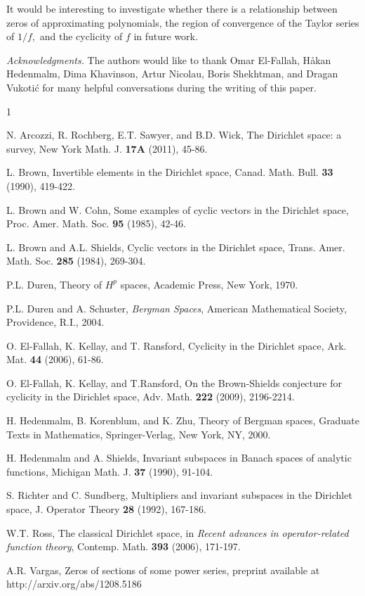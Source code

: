 \documentclass[11 pt,reqno]{amsart}
\theoremstyle{definition}
\theoremstyle{remark}
\numberwithin{equation}{section} \numberwithin{figure}{section}
\begin{document}
It would be interesting to investigate whether there is a relationship between zeros of approximating polynomials, the region of convergence of the Taylor series of $1/f,$
and the cyclicity of $f$ in future work.


\textit{Acknowledgments.} The authors would like to thank Omar El-Fallah, H{\aa}kan Hedenmalm, Dima Khavinson, Artur Nicolau, Boris Shekhtman, and Dragan Vukoti\'{c} for many helpful conversations during the writing of this paper.

\begin{thebibliography}{1}

N. Arcozzi, R. Rochberg, E.T. Sawyer, and B.D. Wick, The
Dirichlet space: a survey, New York Math. J. {\bf 17A} (2011), 45-86.

L. Brown, Invertible elements in the Dirichlet space, Canad.
Math. Bull. {\bf 33} (1990), 419-422.

L. Brown and W. Cohn, Some examples of cyclic vectors in
the Dirichlet space, Proc. Amer. Math. Soc. {\bf 95} (1985), 42-46.

L. Brown and A.L. Shields, Cyclic vectors in the Dirichlet space,
Trans. Amer. Math. Soc. {\bf 285} (1984), 269-304.

P.L. Duren, Theory of $H^p$ spaces, Academic Press, New York,
1970.

 P.L. Duren and A. Schuster, \emph{Bergman Spaces}, American
Mathematical Society, Providence, R.I., 2004.

O. El-Fallah, K. Kellay, and T. Ransford, Cyclicity in the
Dirichlet space,
Ark. Mat. {\bf 44} (2006), 61-86.

O. El-Fallah, K. Kellay, and T.Ransford, On the Brown-Shields
conjecture for cyclicity in the Dirichlet space, Adv. Math. {\bf 222} (2009),
2196-2214.

H. Hedenmalm, B. Korenblum, and K. Zhu, Theory of Bergman
spaces, Graduate Texts in Mathematics, Springer-Verlag, New York, NY, 2000.

H. Hedenmalm and A. Shields, Invariant subspaces in Banach spaces
of analytic functions, Michigan Math. J. {\bf 37} (1990), 91-104.

S. Richter and C. Sundberg, Multipliers and invariant subspaces
in the Dirichlet space, J. Operator Theory {\bf 28} (1992), 167-186.

W.T. Ross, The classical Dirichlet space, in {\it Recent
advances in operator-related function theory}, Contemp. Math. {\bf 393} (2006),
171-197.

A.R. Vargas, Zeros of sections of some power series, preprint available at
http://arxiv.org/abs/1208.5186
\end{thebibliography}
\end{document}
